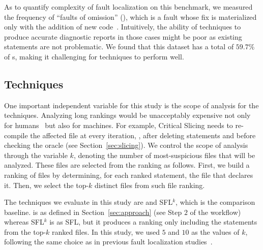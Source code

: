 \documentclass{article}
\begin{document}
As to quantify complexity of fault localization on this benchmark, we
measured the frequency of ``faults of omission'' (\foo), which is a
fault whose fix is materialized only with the addition of new
code~\cite{Pearson:2017:EIF:3097368.3097441}. Intuitively, the ability
of techniques to produce accurate diagnostic reports in those cases
might be poor as existing statements are not problematic. We found
that this dataset has a total of $59.7\%$ of \foo s, making it
challenging for techniques to perform well.


\subsection{Techniques}
One important independent variable for this study is the scope of
analysis for the techniques. Analyzing long rankings would be
unacceptably expensive not only for
humans~\cite{Parnin:2011:ADT:2001420.2001445} but also for
machines. For example, Critical Slicing needs to re-compile the
affected file at every iteration, \ie{}, after deleting statements and
before checking the oracle (see Section~\ref{sec:slicing}).
We control the scope of analysis through the variable $k$, denoting
the number of most-suspicious files that will be analyzed. These files
are selected from the \sfl{} ranking as follows. First, we build a
ranking of files by determining, for each ranked statement, the file
that declares it. Then, we select the top-$k$ distinct files from such
file ranking.

The techniques we evaluate in this study are  and
SFL$^{k}$, which is the comparison baseline.  is as defined
in Section~\ref{sec:approach} (see Step $2$ of the workflow) whereas
SFL$^{k}$ is as SFL, but it produces a ranking only including the
statements from the top-$k$ ranked files. In this study, we used $5$
and $10$ as the values of $k$, following the same choice as in
previous fault localization
studies~\cite{ang-perez-van-deursen-rui-2017}.

\end{document}
